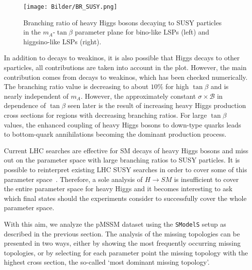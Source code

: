 \documentclass[11pt,a4paper]{article}
\begin{document}
\begin{figure}[h]
\centering
\texttt{[image: Bilder/BR\_SUSY.png]}
\caption{Branching ratio of heavy Higgs bosons decaying to SUSY particles in the $m_A$-$\tan\beta$ parameter plane for bino-like LSPs (left) and higgsino-like LSPs (right).}\label{fig_BR_3D}
\end{figure}

In addition to decays to weakinos, it is also possible that Higgs decays to other sparticles, all contributions are taken into account in the plot. However, the main contribution comes from decays to weakinos, which has been checked numerically. The branching ratio value is decreasing to about $10\%$ for high $\tan\beta$ and is nearly independent of $m_A$. However, the approximately constant $\sigma\times\mathcal{B}$ in dependence of $\tan\beta$ seen later is the result of increasing heavy Higgs production cross sections for regions with decreasing branching ratios. For large $\tan\beta$ values, the enhanced coupling of heavy Higgs bosons to down-type quarks leads to bottom-quark annihilations becoming the dominant production process.

Current LHC searches are effective for SM decays of heavy Higgs bosons and miss out on the parameter space with large branching ratios to SUSY particles. It is possible to reinterpret existing LHC SUSY searches in order to cover some of this parameter space~\cite{Bisset:2007mi, Barman:2016kgt}. Therefore, a sole analysis of $H\rightarrow SM$ is insufficient to cover the entire parameter space for heavy Higgs and it becomes interesting to ask which final states should the experiments consider to successfully cover the whole parameter space. 

With this aim, we analyze the pMSSM dataset using the \texttt{SModelS} setup as described in the previous section. The analysis of the missing topologies can be presented in two ways, either by showing the most frequently occurring missing topologies, or by selecting for each parameter point the missing topology with the highest cross section, the so-called `most dominant missing topology'.
\end{document}
